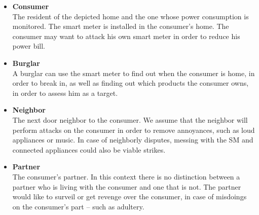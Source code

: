 \begin{itemize}
\item \textbf{Consumer}\\
The resident of the depicted home and the one whose power consumption is monitored.
The smart meter is installed in the consumer's home.
The consumer may want to attack his own smart meter in order to reduce his power bill.
\item \textbf{Burglar}\\ A burglar can use the smart meter to find out when the consumer is home, in order to break in, as well as finding out which products the consumer owns, in order to assess him as a target.
\item \textbf{Neighbor}\\
The next door neighbor to the consumer.
We assume that the neighbor will perform attacks on the consumer in order to remove annoyances, such as loud appliances or music.
In case of neighborly disputes, messing with the SM and connected appliances could also be viable strikes.
\item \textbf{Partner}\\
The consumer's partner.
In this context there is no distinction between a partner who is living with the consumer and one that is not.
The partner would like to surveil or get revenge over the consumer, in case of misdoings on the consumer's part -- such as adultery.


\end{itemize}
